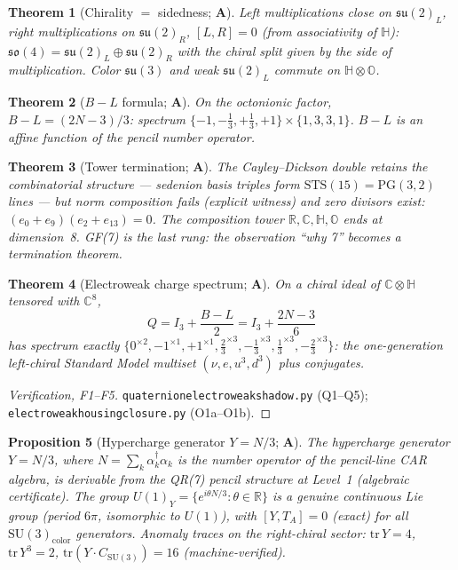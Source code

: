 \documentclass[11pt]{article}
\newtheorem{theorem}{Theorem}[section]
\newtheorem{proposition}[theorem]{Proposition}
\theoremstyle{remark}
\newcommand{\lean}[1]{%
  \penalty-100
  \begingroup\def\_{\textunderscore\allowbreak}\texttt{#1}\endgroup}
\newcommand{\CatA}{\textbf{A}}
\begin{document}
\begin{theorem}[Chirality $=$ sidedness; \CatA]
\label{thm:F2}
Left multiplications close on $\mathfrak{su}(2)_L$, right multiplications
on $\mathfrak{su}(2)_R$, $[L,R] = 0$ (from associativity of $\mathbb{H}$):
$\mathfrak{so}(4) = \mathfrak{su}(2)_L\oplus\mathfrak{su}(2)_R$ with the
chiral split given by the side of multiplication.
Color $\mathfrak{su}(3)$ and weak $\mathfrak{su}(2)_L$ commute on
$\mathbb{H}\otimes\mathbb{O}$.
\end{theorem}

\begin{theorem}[$B-L$ formula; \CatA]
\label{thm:F3}
On the octonionic factor, $B-L = (2N-3)/3$: spectrum
$\{-1, -\tfrac{1}{3}, +\tfrac{1}{3}, +1\}\times\{1,3,3,1\}$.
$B-L$ is an affine function of the pencil number operator.
\end{theorem}

\begin{theorem}[Tower termination; \CatA]
\label{thm:F4}
The Cayley--Dickson double retains the combinatorial structure --- sedenion
basis triples form $\mathrm{STS}(15) = \mathrm{PG}(3,2)$ lines --- but
norm composition fails (explicit witness) and zero divisors exist:
$(e_0 + e_9)(e_2 + e_{13}) = 0$.
The composition tower $\mathbb{R}, \mathbb{C}, \mathbb{H}, \mathbb{O}$ ends at
dimension~8. \emph{GF(7) is the last rung}: the observation ``why 7'' becomes
a termination theorem.
\end{theorem}

\begin{theorem}[Electroweak charge spectrum; \CatA]
\label{thm:F5}
On a chiral ideal of $\mathbb{C}\otimes\mathbb{H}$ tensored with $\mathbb{C}^8$,
\[
  Q = I_3 + \frac{B-L}{2} = I_3 + \frac{2N-3}{6}
\]
has spectrum exactly $\{0^{\times 2}, -1^{\times 1}, +1^{\times 1},
\tfrac{2}{3}^{\times 3}, -\tfrac{1}{3}^{\times 3}, \tfrac{1}{3}^{\times 3},
-\tfrac{2}{3}^{\times 3}\}$: the one-generation left-chiral Standard Model
multiset $(\nu, e, u^3, d^3)$ plus conjugates.
\end{theorem}

\begin{proof}[Verification, F1--F5]
\lean{quaternion\_electroweak\_shadow.py} (Q1--Q5);
\lean{electroweak\_housing\_closure.py} (O1a--O1b).
\end{proof}

\begin{proposition}[Hypercharge generator $Y=N/3$; \CatA]
\label{prop:O1prime}
The hypercharge generator $Y = N/3$, where
$N = \sum_k \alpha_k^\dagger\alpha_k$ is the number operator of the pencil-line
CAR algebra, is derivable from the QR(7) pencil structure at Level~1
(algebraic certificate).
The group $U(1)_Y = \{e^{i\theta N/3} : \theta\in\mathbb{R}\}$ is a genuine
continuous Lie group (period $6\pi$, isomorphic to $U(1)$), with $[Y, T_A] = 0$
(exact) for all $\mathrm{SU}(3)_{\mathrm{color}}$ generators.
Anomaly traces on the right-chiral sector:
$\mathrm{tr}\,Y = 4$, $\mathrm{tr}\,Y^3 = 2$,
$\mathrm{tr}(Y\cdot C_{\mathrm{SU}(3)}) = 16$ (machine-verified).
\end{proposition}
\end{document}
